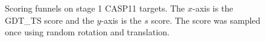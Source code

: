 \documentclass[letter,10pt]{article}
\begin{document}
\begin{figure}[H]
    \vspace{-2em}
    \centering
    \caption{Scoring funnels on stage 1 CASP11 targets. The
      $x$-axis is the GDT\_TS score and the $y$-axis is the $s$
      score. The score was sampled once using random rotation and
      translation.}
    \label{Fig:Satage1CASP11Funnels}
\end{figure}
\end{document}
